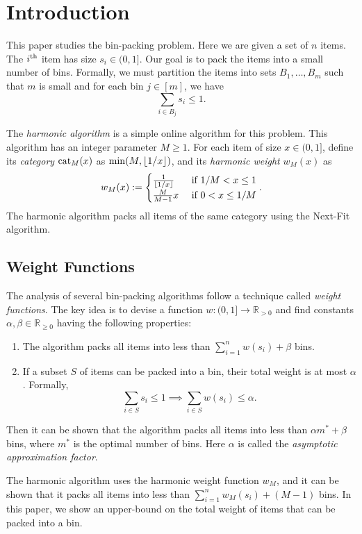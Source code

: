 \section{Introduction}
\label{sec:intro}

This paper studies the bin-packing problem.
Here we are given a set of $n$ items. The $i^{\textrm{th}}$ item has size $s_i \in (0, 1]$.
Our goal is to pack the items into a small number of bins.
Formally, we must partition the items into sets $B_1, \ldots, B_m$ such that
$m$ is small and for each bin $j \in [m]$, we have
\[ \sum_{i \in B_j} s_i \le 1. \]

The \emph{harmonic algorithm} \cite{lee1985simple} is a simple online algorithm for this problem.
This algorithm has an integer parameter $M \ge 1$.
For each item of size $x \in (0, 1]$, define its \emph{category} $\operatorname{cat}_M(x)$
as $\min(M, \lfloor 1/x \rfloor)$, and its \emph{harmonic weight} $w_M(x)$ as
\[ w_M(x) := \begin{cases}
    \frac{1}{\lfloor 1/x \rfloor} & \text{ if } 1/M < x \le 1
    \\ \frac{M}{M-1}x & \text{ if } 0 < x \le 1/M
\end{cases}. \]
The harmonic algorithm packs all items of the same category using the Next-Fit algorithm.

\subsection{Weight Functions}

The analysis of several bin-packing algorithms follow a technique called \emph{weight functions}.
The key idea is to devise a function $w: (0, 1] \to \mathbb{R}_{> 0}$
and find constants $\alpha, \beta \in \mathbb{R}_{\ge 0}$ having the following properties:
\begin{enumerate}
\item The algorithm packs all items into less than $\sum_{i=1}^n w(s_i) + \beta$ bins.
\item If a subset $S$ of items can be packed into a bin, their total weight is at most $\alpha$. Formally,
    \[ \sum_{i \in S} s_i \le 1 \implies \sum_{i \in S} w(s_i) \le \alpha. \]
\end{enumerate}
Then it can be shown that the algorithm packs all items into less than $\alpha m^* + \beta$ bins,
where $m^*$ is the optimal number of bins.
Here $\alpha$ is called the \emph{asymptotic approximation factor}.

The harmonic algorithm uses the harmonic weight function $w_M$,
and it can be shown that it packs all items into less than $\sum_{i=1}^n w_M(s_i) + (M-1)$ bins.
In this paper, we show an upper-bound on the total weight of items that can be packed into a bin.

